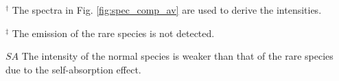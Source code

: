 \begin{table*}
\begin{threeparttable}
\begin{tablenotes}
\item[$^\dag$] The spectra in Fig. \ref{fig:spec_comp_av} are used to derive the intensities.
\item[$^\ddag$] The emission of the rare species is not detected. 
\item[$SA$] The intensity of the normal species is weaker than that of the rare species due to the self-absorption effect.
\end{tablenotes}
\end{threeparttable}
\end{table*}
